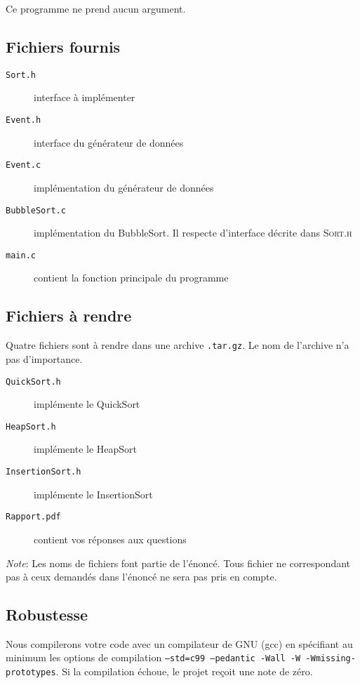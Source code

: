\documentclass[a4paper,10pt]{article}
\begin{document}
Ce programme ne prend aucun argument.

\subsection*{Fichiers fournis}
\begin{description}
\item[\texttt{Sort.h}] interface à implémenter
\item[\texttt{Event.h}] interface du générateur de données
\item[\texttt{Event.c}] implémentation du générateur de données
\item[\texttt{BubbleSort.c}] implémentation du BubbleSort. Il respecte d'interface décrite dans \textsc{Sort.h}
\item[\texttt{main.c}] contient la fonction principale du programme
\end{description}
\subsection*{Fichiers à rendre}
Quatre fichiers sont à rendre dans une archive \texttt{.tar.gz}. Le nom de l'archive n'a pas d'importance.
\begin{description}
\item[\texttt{QuickSort.h}] implémente le QuickSort
\item[\texttt{HeapSort.h}] implémente le HeapSort
\item[\texttt{InsertionSort.h}] implémente le InsertionSort
\item[\texttt{Rapport.pdf}] contient vos réponses aux questions
\end{description}

{\em Note}: Les noms de fichiers font partie de l'énoncé. Tous fichier ne
correspondant pas à ceux demandés dans l'énoncé ne sera pas pris en compte.

\subsection*{Robustesse}

Nous compilerons votre code avec un compilateur de GNU (gcc) en spécifiant au
minimum les options de compilation \texttt{--std=c99 --pedantic -Wall -W -Wmissing-
prototypes}. Si la compilation échoue, le projet reçoit une note de zéro.
\end{document}
